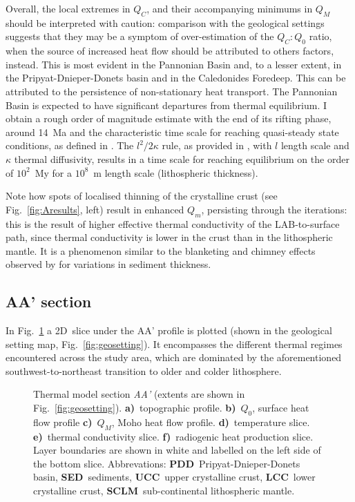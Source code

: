 Overall, the local extremes in $Q_C$, and their accompanying minimums in $Q_M$ should be interpreted with caution: comparison with the geological settings suggests that they may be a symptom of over-estimation of the $Q_C:Q_0$ ratio, when the source of increased heat flow should be attributed to others factors, instead.
This is most evident in the Pannonian Basin and, to a lesser extent, in the Pripyat-Dnieper-Donets basin and in the Caledonides Foredeep.
This can be attributed to the persistence of non-stationary heat transport.
The Pannonian Basin is expected to have significant departures from thermal equilibrium.
I obtain a rough order of magnitude estimate with the end of its rifting phase, around 14~Ma \parencite{Horvath2015} and the characteristic time scale for reaching quasi-steady state conditions, as defined in \parencite{stuwe2007geodynamics}.
The $l^2 / 2\kappa$ rule, as provided in \textcite{stuwe2007geodynamics}, with $l$ length scale and $\kappa$ thermal diffusivity, results in a time scale for reaching equilibrium on the order of $10^2$~My for a $10^8$~m length scale (lithospheric thickness).

Note how spots of localised thinning of the crystalline crust (see Fig.~\ref{fig:Aresults}, left) result in enhanced $Q_m$, persisting through the iterations: this is the result of higher effective thermal conductivity of the LAB-to-surface path, since thermal conductivity is lower in the crust than in the lithospheric mantle.
It is a phenomenon similar to the blanketing and chimney effects observed by \textcite{Przybycin2015} for variations in sediment thickness.

\subsection{AA' section}
\label{ss:Appl:DiscTherm:Section}

In Fig.~\ref{fig:AAsection} a 2D~slice under the AA' profile is plotted (shown in the geological setting map, Fig.~\ref{fig:geosetting}).
It encompasses the different thermal regimes encountered across the study area, which are dominated by the aforementioned southwest-to-northeast transition to older and colder lithosphere.

\begin{figure}
	\begin{adjustbox}{center}
	\end{adjustbox}
	\caption[Thermal model section AA'.]{Thermal model section \textit{AA'} (extents are shown in Fig.~\ref{fig:geosetting}).
	\textbf{a)}~topographic profile.
	\textbf{b)}~$Q_0$, surface heat flow profile
	\textbf{c)}~$Q_M$, Moho heat flow profile.
	\textbf{d)}~temperature slice.
	\textbf{e)}~thermal conductivity slice.
	\textbf{f)}~radiogenic heat production slice.
	Layer boundaries are shown in white and labelled on the left side of the bottom slice.
	Abbrevations: \textbf{PDD}~Pripyat-Dnieper-Donets basin, \textbf{SED}~sediments, \textbf{UCC}~upper crystalline crust, \textbf{LCC}~lower crystalline crust, \textbf{SCLM}~sub-continental lithospheric mantle.}
	\label{fig:AAsection}
\end{figure}

